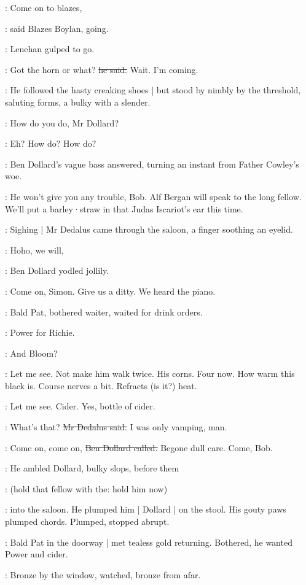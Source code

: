 \boylan:
Come on to blazes,

:
said Blazes Boylan,
going.

:
Lenehan gulped to go.

\lenehan:
Got the horn or what?
\sout{he said.}
Wait.
I'm coming.

:
He followed the hasty creaking shoes |
but stood by nimbly by the threshold,
saluting forms,
a bulky with a slender.

\lenehan:
How do you do,
Mr Dollard?

\dollard:
Eh?
How do?
How do?

:
Ben Dollard's vague bass answered,
turning an instant from Father Cowley's woe.

\dollard:
He won't give you any trouble,
Bob.
Alf Bergan will speak to the long fellow.
We'll put a barley·straw in that Judas Iscariot's ear
this time.

:
Sighing |
Mr Dedalus came through the saloon,
a finger soothing an eyelid.

\dollard:
Hoho,
we will,

:
Ben Dollard yodled jollily.

\dollard:
Come on,
Simon.
Give us a ditty.
We heard the piano.

:
Bald Pat,
bothered waiter,
waited for drink orders.

:
Power for Richie.

:
And Bloom?

\BloomInt:
Let me see.
Not make him walk twice.
His corns.
Four now.
How warm this black is.
Course nerves a bit.
Refracts (is it?) heat.

\Bloom:
Let me see.
Cider.
Yes,
bottle of cider.

\simon:
What's that?
\sout{Mr Dedalus said.}
I was only vamping,
man.

\dollard:
Come on,
come on,
\sout{Ben Dollard called.}
Begone dull care.
Come,
Bob.

:
He ambled Dollard,
bulky slops,
before them

\simon:
(hold that fellow with the:
hold him now)

:
into the saloon.
He plumped him |
Dollard |
on the stool.
His gouty paws plumped chords.
Plumped,
stopped abrupt.

:
Bald Pat in the doorway |
met tealess gold returning.
Bothered,
he wanted Power and cider.

:
Bronze by the window,
watched,
bronze from afar.

